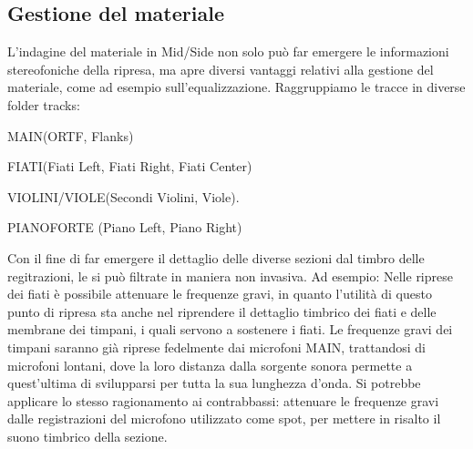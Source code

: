 \subsection{Gestione del materiale}
L'indagine del materiale in Mid/Side non solo può far emergere le informazioni stereofoniche della ripresa, ma apre diversi vantaggi relativi alla gestione del materiale, come ad esempio sull'equalizzazione. Raggruppiamo le tracce in diverse folder tracks:
\begin{compactitem} 
	\item MAIN(ORTF, Flanks)
	\item FIATI(Fiati Left, Fiati Right, Fiati Center)
	\item VIOLINI/VIOLE(Secondi Violini, Viole).
	\item PIANOFORTE (Piano Left, Piano Right)
	\end{compactitem}
Con il fine di far emergere il dettaglio delle diverse sezioni dal timbro delle regitrazioni, le si può filtrate  in maniera non invasiva.
Ad esempio: Nelle riprese dei fiati è possibile attenuare le frequenze gravi, in quanto l'utilità di questo punto di ripresa sta anche nel riprendere il dettaglio timbrico dei fiati e delle membrane dei timpani, i quali servono a sostenere i fiati. Le frequenze gravi dei timpani saranno già riprese fedelmente dai microfoni MAIN, trattandosi di microfoni lontani, dove la loro distanza dalla sorgente sonora permette a quest'ultima di svilupparsi per tutta la sua lunghezza d'onda.
Si potrebbe applicare lo stesso ragionamento ai contrabbassi: attenuare le frequenze gravi dalle registrazioni del microfono utilizzato come spot, per mettere in risalto il suono timbrico della sezione.


\vfill\null

\newpage %


\vfill\null

\raggedright
%



